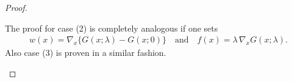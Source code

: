 \begin{proof}
\begin{enumerate}[(a)]
    The proof for case (2) is completely analogous if one sets 
      \begin{align*}
        w(x) = \nabla_x \Big\{ G(x; \lambda) - G(x; 0) \Big\}\quad\text{and}\quad f(x) = \lambda \, \nabla_x G(x; \lambda).
      \end{align*}
    Also case (3) is proven in a similar fashion. 
%


\end{enumerate}
\end{proof}
